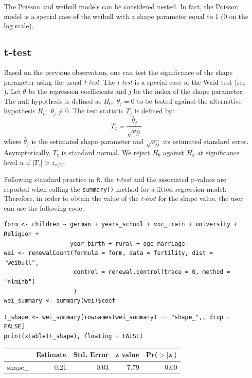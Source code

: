 \documentclass[a4paper,twoside,11pt]{article}
\begin{document}
The Poisson and weibull models can be considered nested. In fact, the Poisson
model is a special case of the weibull with a shape parameter equal to 1 (0 on
the log scale).


\subsection{t-test}
\label{sec:org0719a27}

Based on the previous observation, one can test the significance of the shape
parameter using the usual \emph{t-test}. The \emph{t-test} is a special case of the Wald
test (see \citet[Section 2.6]{cameron2013regression}). Let \(\theta\) be the
regression coefficients and \(j\) be the index of the shape parameter. The
null hypothesis is defined as \(H_0: \ \theta_j = 0\) to be tested against the
alternative hypothesis  \(H_a: \ \theta_j \neq 0\). The test statistic \(T_z\) is defined by:
\begin{equation}
   T_z = \frac{\hat{\theta}_j}{\sqrt{v_{jj}}}
\end{equation}
where \(\hat{\theta}_j\) is the estimated shape parameter and \(\sqrt{v_{jj}}\) its
estimated standard error. Asymptotically, \(T_z\) is standard normal. We reject
\(H_0\) against \(H_a\) at significance level \(\alpha\) if \(|T_z| > z_{\alpha / 2}\).

Following standard practice in \texttt{R}, the \emph{t-test} and the associated p-values are
reported when calling the \texttt{summary()} method for a fitted regression
model. Therefore, in order to obtain the value of the \emph{t-test} for the shape
value, the user can use the following code:

\begin{verbatim}
form <- children ~ german + years_school + voc_train + university + Religion +
                   year_birth + rural + age_marriage
wei <- renewalCount(formula = form, data = fertility, dist = "weibull",
                    control = renewal.control(trace = 0, method = "nlminb")
                    )
wei_summary <- summary(wei)$coef
\end{verbatim}


\begin{verbatim}
t_shape <- wei_summary[rownames(wei_summary) == "shape_",, drop = FALSE]
print(xtable(t_shape), floating = FALSE)
\end{verbatim}

\begin{tabular}{rrrrr}
  \hline
 & Estimate & Std. Error & z value & Pr($>$$|$z$|$) \\ 
  \hline
shape\_ & 0.21 & 0.03 & 7.79 & 0.00 \\ 
   \hline
\end{tabular}
\end{document}
